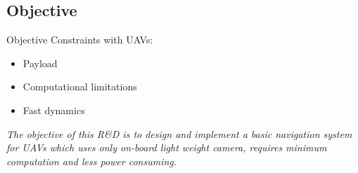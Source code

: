 \documentclass[8pt]{beamer}
\begin{document}
\subsection{Objective}
\begin{frame}{Objective}
  Constraints with UAVs:
  \begin{itemize}
  \setlength\itemsep{1em}
  \item {Payload %
  }
  \item {Computational limitations}
 \item {Fast dynamics}
  \end{itemize}
  \bigskip
  \textit{The objective of this R\&D is to design and implement a basic navigation system for UAVs
  which uses only on-board light weight camera, requires minimum computation and less power consuming.}  
\end{frame}

\end{document}
